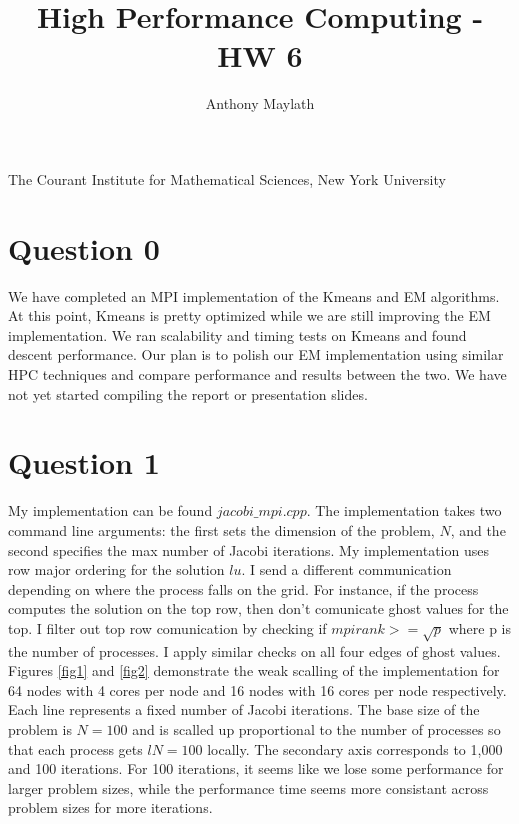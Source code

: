 \documentclass[10pt]{article}
\title{High Performance Computing - HW 6}
\author{Anthony Maylath}
\begin{document}
\maketitle

\begin{center}

The Courant Institute for Mathematical Sciences, New York University \\ 

\end{center}

\setcounter{MaxMatrixCols}{13}

\section{Question 0}

We have completed an MPI implementation of the Kmeans and EM algorithms. At this point, Kmeans is pretty optimized while we are still improving the EM implementation. We ran scalability and timing tests on Kmeans and found descent performance. Our plan is to polish our EM  implementation using similar HPC techniques and compare performance and results between the two. We have not yet started compiling the report or presentation slides.

\section{Question 1}

My implementation can be found $jacobi\_mpi.cpp$. The implementation takes two command line arguments: the first sets the dimension of the problem, $N$, and the second specifies the max number of Jacobi iterations. My implementation uses row major ordering for the solution $lu$. I send a different communication depending on where the process falls on the grid. For instance, if the process computes the solution on the top row, then don't comunicate ghost values for the top. I filter out top row comunication by checking if $mpirank >= \sqrt{p}$ where p is the number of processes. I apply similar checks on all four edges of ghost values.\\

Figures \ref{fig1} and \ref{fig2} demonstrate the weak scalling of the implementation for 64 nodes with 4 cores per node and 16 nodes with 16 cores per node respectively. Each line represents a fixed number of Jacobi iterations. The base size of the problem is $N=100$ and is scalled up proportional to the number of processes so that each process gets $lN = 100$ locally. The secondary axis corresponds to 1,000 and 100 iterations. For 100 iterations, it seems like we lose some performance for larger problem sizes, while the performance time seems more consistant across problem sizes for more iterations.\\
\end{document}
